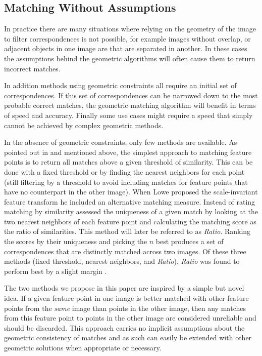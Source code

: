 \subsection{Matching Without Assumptions}

In practice there are many situations where relying on the geometry of 
the image to filter correspondences is not possible, for example images 
without overlap, or adjacent objects in one image are that are separated 
in another. In these cases the assumptions behind the geometric 
algorithms will often cause them to return incorrect matches.  

In addition methods using geometric constraints all require an initial 
set of correspondences. If this set of correspondences can be narrowed 
down to the most probable correct matches, the geometric matching 
algorithm will benefit in terms of speed and accuracy.  Finally some use 
cases might require a speed that simply cannot be achieved by complex 
geometric methods.

In the absence of geometric constraints, only few methods are available.  
As pointed out in \cite{szeliski2010} and mentioned above, the simplest 
approach to matching feature points is to return all matches above a 
given threshold of similarity.  This can be done with a fixed threshold 
or by finding the nearest neighbors for each point (still filtering by a 
threshold to avoid including matches for feature points that have no 
counterpart in the other image).  When Lowe \cite{lowe2004sift} proposed 
the scale-invariant feature transform he included an alternative 
matching measure. Instead of rating matching by similarity assessed the 
uniqueness of a given match by looking at the two nearest neighbors of 
each feature point and calculating the matching score as the ratio of 
similarities. This method will later be referred to as \emph{Ratio}.  
Ranking the scores by their uniqueness and picking the $n$ best produces 
a set of correspondences that are distinctly matched across two images.  
Of these three methods (fixed threshold, nearest neighbors, and 
\emph{Ratio}), \emph{Ratio} was found to perform best by a slight margin 
\cite{mikolajczyk2005performance}.

The two methods we propose in this paper are inspired by a simple but 
novel idea. If a given feature point in one image is better matched with 
other feature points from the \emph{same} image than points in the other 
image, then any matches from this feature point to points in the other 
image are considered unreliable and should be discarded.  This approach 
carries no implicit assumptions about the geometric consistency of 
matches and as such can easily be extended with other geometric 
solutions when appropriate or necessary.

